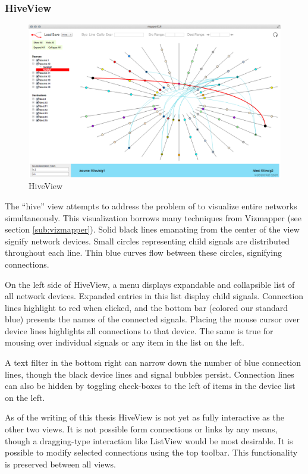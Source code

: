 	\subsubsection{HiveView}

\begin{figure}[ht]
\centering
	\includegraphics[width=\textwidth]{figures/hive}
\caption{HiveView}
\label{fig:hive}
\end{figure}
	
The ``hive'' view attempts to address the problem of to visualize entire networks simultaneously. This visualization borrows many techniques from Vizmapper (see section \ref{sub:vizmapper}). Solid black lines emanating from the center of the view signify network devices. Small circles representing child signals are distributed throughout each line. Thin blue curves flow between these circles, signifying connections. 

On the left side of HiveView, a menu displays expandable and collapsible list of all network devices. Expanded entries in this list display child signals. Connection lines highlight to red when clicked, and the bottom bar (colored our standard blue) presents the names of the connected signals. Placing the mouse cursor over device lines highlights all connections to that device. The same is true for mousing over individual signals or any item in the list on the left.

A text filter in the bottom right can narrow down the number of blue connection lines, though the black device lines and signal bubbles persist. Connection lines can also be hidden by toggling check-boxes to the left of items in the device list on the left.

As of the writing of this thesis HiveView is not yet as fully interactive as the other two views. It is not possible form connections or links by any means, though a dragging-type interaction like ListView would be most desirable. It is possible to modify selected connections using the top toolbar. This functionality is preserved between all views.

